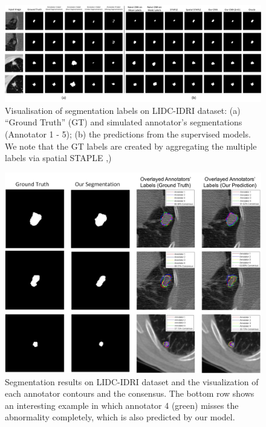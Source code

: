 \begin{figure}[t!]
    \vspace{-3mm}
    \centering
    \includegraphics[width=\linewidth]{chapter_8_neurips/picture17.jpg}
        \vspace{-2mm}
    \caption{\footnotesize Visualisation of segmentation labels on LIDC-IDRI dataset: (a) ``Ground Truth'' (GT) and simulated annotator's segmentations (Annotator 1 - 5); (b) the predictions from the supervised models. We note that the GT labels are created by aggregating the multiple labels via spatial STAPLE \cite{asman2012formulating},)} 
    \label{LIDC segmentation}
    \vspace{-2mm}
\end{figure}


\begin{figure}[t!]
        \centering
        \includegraphics[width=\linewidth]{chapter_8_neurips/picture10.jpg}
        \caption{\footnotesize Segmentation results on LIDC-IDRI dataset and the visualization of each annotator contours and the consensus. The bottom row shows an interesting example in which annotator 4 (green) misses the abnormality completely, which is also predicted by our model.}
        \label{LIDCresults}
\end{figure}


